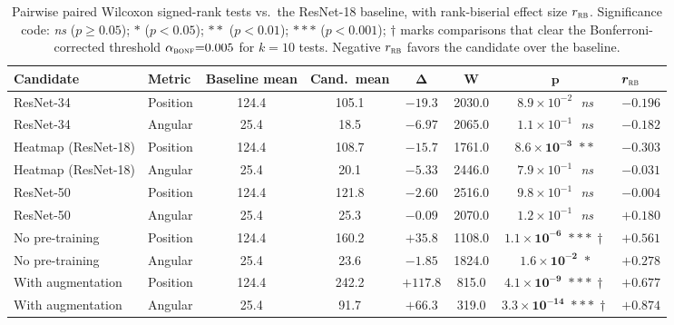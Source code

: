\documentclass[conference,10pt,letterpaper]{IEEEtran}
\newcommand{\rnt}{ResNet-34}
\newcommand{\rne}{ResNet-18}
\begin{document}
\begin{table}[t]
\caption{Pairwise paired Wilcoxon signed-rank tests vs.\ the
\protect\rne{} baseline, with rank-biserial effect size $r_\textsc{rb}$.
Significance code: \textit{ns} ($p\ge 0.05$); $*$ ($p<0.05$); $**$
($p<0.01$); $***$ ($p<0.001$); $\dagger$ marks comparisons that clear
the Bonferroni-corrected threshold $\alpha_\textsc{bonf}{=}0.005$ for
$k{=}10$ tests. Negative $r_\textsc{rb}$ favors the candidate over the
baseline.}
\label{tab:wilcoxon}
\centering
\renewcommand{\arraystretch}{1.20}
\small
\begin{tabular}{l l c c c c c l}
\toprule
\textbf{Candidate} & \textbf{Metric} & \textbf{Baseline mean} &
\textbf{Cand.\ mean} & $\boldsymbol{\Delta}$ &
$\boldsymbol{W}$ & $\boldsymbol{p}$ & $\boldsymbol{r_\textsc{rb}}$\\
\midrule
\rnt{}                      & Position & 124.4 & 105.1 & $-19.3$ & 2030.0 & $8.9{\times}10^{-2}$\ \,\textit{ns}                 & $-0.196$\\
\rnt{}                      & Angular  &  25.4 &  18.5 & $-6.97$ & 2065.0 & $1.1{\times}10^{-1}$\ \,\textit{ns}                 & $-0.182$\\
Heatmap (\rne)              & Position & 124.4 & 108.7 & $-15.7$ & 1761.0 & $\mathbf{8.6{\times}10^{-3}}$\ $**$                 & $-0.303$\\
Heatmap (\rne)              & Angular  &  25.4 &  20.1 & $-5.33$ & 2446.0 & $7.9{\times}10^{-1}$\ \,\textit{ns}                 & $-0.031$\\
ResNet-50                   & Position & 124.4 & 121.8 & $-2.60$ & 2516.0 & $9.8{\times}10^{-1}$\ \,\textit{ns}                 & $-0.004$\\
ResNet-50                   & Angular  &  25.4 &  25.3 & $-0.09$ & 2070.0 & $1.2{\times}10^{-1}$\ \,\textit{ns}                 & $+0.180$\\
No pre-training             & Position & 124.4 & 160.2 & $+35.8$ & 1108.0 & $\mathbf{1.1{\times}10^{-6}}$\ $***\,\dagger$        & $+0.561$\\
No pre-training             & Angular  &  25.4 &  23.6 & $-1.85$ & 1824.0 & $\mathbf{1.6{\times}10^{-2}}$\ $*$                  & $+0.278$\\
With augmentation           & Position & 124.4 & 242.2 & $+117.8$ & 815.0 & $\mathbf{4.1{\times}10^{-9}}$\ $***\,\dagger$        & $+0.677$\\
With augmentation           & Angular  &  25.4 &  91.7 & $+66.3$ &  319.0 & $\mathbf{3.3{\times}10^{-14}}$\ $***\,\dagger$      & $+0.874$\\
\bottomrule
\end{tabular}
\end{table}
\end{document}

